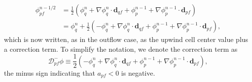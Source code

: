 \documentclass[../thesis.tex]{subfiles}
\begin{document}
\begin{equation}
	\begin{split}
		\phi_{pf}^{n-1/2}
		&= \frac{1}{2}(\phi_q^{n} + \nabla\phi_q^{n}\cdot\mathbf{d}_{qf} +
		\phi_p^{n-1} + \nabla\phi_p^{n-1}\cdot\mathbf{d}_{pf}) \\
		&= \phi_q^{n} + \frac{1}{2}(-\phi_q^{n} + \nabla\phi_q^{n}\cdot\mathbf{d}_{qf} +
		\phi_p^{n-1} + \nabla\phi_p^{n-1}\cdot\mathbf{d}_{pf}),
	\end{split}
\end{equation}
which is now written, as in the outflow case,
as the upwind cell center value plus a correction term.
To simplify the notation, we denote the correction term as
\[
	\mathcal{D}_{pf}^-\phi
	\equiv
	\frac{1}{2}(-\phi_q^{n} + \nabla\phi_q^{n}\cdot\mathbf{d}_{qf} +
	\phi_p^{n-1} + \nabla\phi_p^{n-1}\cdot\mathbf{d}_{pf}),
\]
the minus sign indicating that $ a_{pf} < 0 $ is negative.
\end{document}
